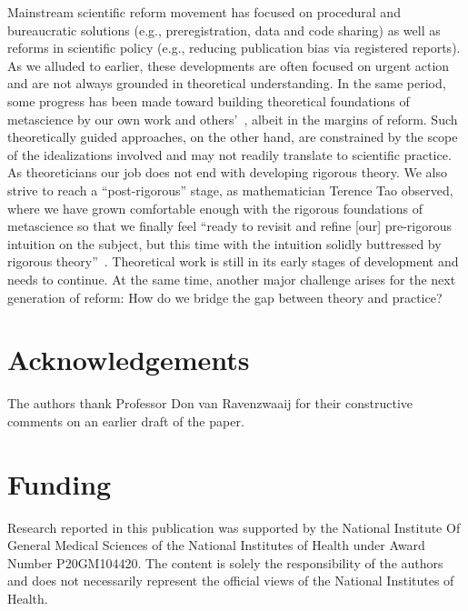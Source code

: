 \documentclass[meta,authordate,issue]{jote-new-article}
\begin{document}
Mainstream scientific reform movement has focused on procedural and bureaucratic solutions (e.g., preregistration, data and code sharing) as well as reforms in scientific policy (e.g., reducing publication bias via registered reports). As we alluded to earlier, these developments are often focused on urgent action and are not always grounded in theoretical understanding. In the same period, some progress has been made toward building theoretical foundations of metascience by our own work and others'~\parencites{bak2022replication}{fanelli2022metric}{fanelli2022tau}{smaldino2016natural}, albeit in the margins of reform. Such theoretically guided approaches, on the other hand, are constrained by the scope of the idealizations involved and may not readily translate to scientific practice. As theoreticians our job does not end with developing rigorous theory. We also strive to reach a ``post-rigorous'' stage, as mathematician Terence Tao observed, where we have grown comfortable enough with the rigorous foundations of metascience so that we finally feel ``ready to revisit and refine [our] pre-rigorous intuition on the subject, but this time with the intuition solidly buttressed by rigorous theory''~\parencite{tao_2007}. Theoretical work is still in its early stages of development and needs to continue. At the same time, another major challenge arises for the next generation of reform: How do we bridge the gap between theory and practice?

\section{Acknowledgements}
The authors thank Professor Don van Ravenzwaaij for their constructive comments on an earlier draft of the paper.

\section{Funding}
Research reported in this publication was supported by the National Institute Of General Medical Sciences of the National Institutes of Health under Award Number P20GM104420. The content is solely the responsibility of the authors and does not necessarily represent the official views of the National Institutes of Health.

\end{document}
